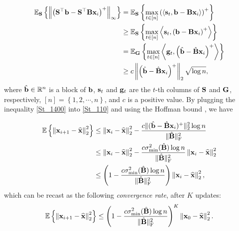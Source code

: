 \documentclass[12pt,draftcls,onecolumn]{IEEEtran}
\begin{document}
\begin{equation}
\label{St_1400}
\begin{aligned}
\mathbb{E}_{\mbS}\left\{\left\|\left(\mbS^{\top} \mbb-\mbS^{\top}\mbB\mbx_i\right)^{+}\right\|_{\infty}\right\} &=\mathbb{E}_{\mbS}\left\{\max_{t\in[n]}\left(\left\langle \mbs_t, \mbb-\mbB\mbx_{i}\right\rangle\right)^{+}\right\}\\
&\geq\mathbb{E}_{\mbS}\left\{\max_{t\in[n]}\left\langle \mbs_t, \left(\mbb-\mbB\mbx_{i}\right)^{+}\right\rangle\right\}\\
&=\mathbb{E}_{\mbG}\left\{\max_{t\in[n]}\left\langle \mbg_t, \left(\hat{\mbb}-\hat{\mbB}\mbx_{i}\right)^{+}\right\rangle\right\}\\
&\geq c\left\|\left(\hat{\mbb}-\hat{\mbB}\mbx_{i}\right)^{+}\right\|_2 \sqrt{\log n},
\end{aligned}
\end{equation}\normalsize
where $\hat{\mathbf{b}}\in\mathbb{R}^{n}$ is a block of $\mathbf{b}$, $\mathbf{s}_{t}$ and $\mathbf{g}_{t}$ are the $t$-th columns of $\mathbf{S}$ and $\mathbf{G}$, respectively, $[n]=\left\{1,2,\cdots,n\right\}$, and $c$ is a positive value.
By plugging the inequality \eqref{St_1400} into \eqref{St_110} and using the Hoffman bound \cite[Theorem~4.2]{leventhal2010randomized}, we have

\begin{equation}
\label{St_1600}
\begin{aligned}
\mathbb{E}\left\{\left\|\mbx_{i+1}-\widehat{\mbx}\right\|_2^2\right\}&\leq\left\|\mbx_i-\widehat{\mbx}\right\|_2^2-\frac{c\|(\hat{\mbb}-\hat{\mbB}\mbx_{i})^{+}\|_2^2 \log n}{\|\hat{\mbB}\|_{\mathrm{F}}^2}\\
\quad &\leq\left\|\mbx_i-\widehat{\mbx}\right\|_2^2-\frac{c \sigma_{\min }^2(\hat{\mbB}) \log n}{\|\hat{\mbB}\|_{\mathrm{F}}^2}\left\|\mbx_i-\widehat{\mbx}\right\|_2^2\\
\quad &\leq \left(1-\frac{c \sigma_{\min }^2(\hat{\mbB}) \log n}{\|\hat{\mbB}\|_{\mathrm{F}}^2}\right)\left\|\mbx_i-\widehat{\mbx}\right\|_2^2,
\end{aligned}
\end{equation}
which can be recast as the following \emph{convergence rate}, after $K$ updates:
\begin{equation}
\label{St_170}
\begin{aligned}
\mathbb{E}\left\{\left\|\mbx_{i+1}-\widehat{\mbx}\right\|_2^2\right\}\leq \left(1-\frac{c \sigma_{\min }^2(\hat{\mbB}) \log n}{\|\hat{\mbB}\|_{\mathrm{F}}^2}\right)^{K}\left\|\mbx_0-\widehat{\mbx}\right\|_2^2.
\end{aligned}
\end{equation}
\end{document}
